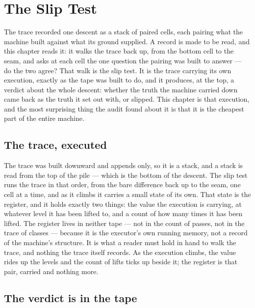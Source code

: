 \chapter{The Slip Test}
\label{chap:the-slip-test}

The trace recorded one descent as a stack of paired cells, each pairing what the machine built against what
its ground supplied. A record is made to be read, and this chapter reads it: it walks the trace back up,
from the bottom cell to the seam, and asks at each cell the one question the pairing was built to answer ---
do the two agree? That walk is the slip test. It is the trace carrying its own execution, exactly as the
tape was built to do, and it produces, at the top, a verdict about the whole descent: whether the truth the
machine carried down came back as the truth it set out with, or slipped. This chapter is that execution, and
the most surprising thing the audit found about it is that it is the cheapest part of the entire machine.

\section{The trace, executed}
\label{se:the-trace-executed}

The trace was built downward and appends only, so it is a stack, and a stack is read from the top of the
pile --- which is the bottom of the descent. The slip test runs the trace in that order, from the bare
difference back up to the seam, one cell at a time, and as it climbs it carries a small state of its own.
That state is the register, and it holds exactly two things: the value the execution is carrying, at
whatever level it has been lifted to, and a count of how many times it has been lifted. The register lives
in neither tape --- not in the count of passes, not in the trace of classes --- because it is the
executor's own running memory, not a record of the machine's structure. It is what a reader must hold in
hand to walk the trace, and nothing the trace itself records. As the execution climbs, the value rides up
the levels and the count of lifts ticks up beside it; the register is that pair, carried and nothing more.

\section{The verdict is in the tape}
\label{se:verdict-in-the-tape}

